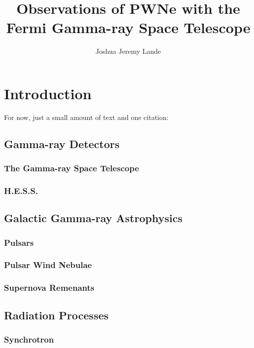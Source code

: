 \documentclass[12pt]{report}
\title{Observations of PWNe with the Fermi Gamma-ray Space Telescope}
\author{Joshua Jeremy Lande}
\begin{document}
 


\beforepreface


\afterpreface




\chapter{Introduction}
For now, just a small amount of text and one citation: \cite{second_lat_catalog_2012}

\section{Gamma-ray Detectors}
\subsection{The \fermi Gamma-ray Space Telescope}
\subsection{H.E.S.S.}

\section{Galactic Gamma-ray Astrophysics}
\subsection{Pulsars}
\subsection{Pulsar Wind Nebulae}
\subsection{Supernova Remenants}

\section{Radiation Processes}
\subsection{Synchrotron}
\end{document}
